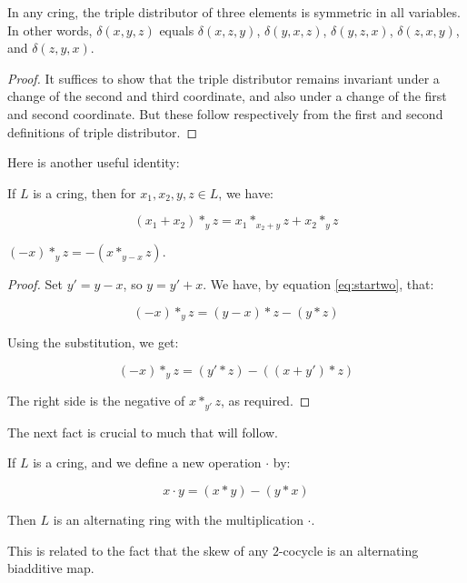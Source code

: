 \documentclass[10pt]{amsart}
\begin{document}
\begin{lemma}
  In any cring, the triple distributor of three elements is symmetric
  in all variables. In other words, $\delta(x,y,z)$ equals
  $\delta(x,z,y)$, $\delta(y,x,z)$, $\delta(y,z,x)$, $\delta(z,x,y)$,
  and $\delta(z,y,x)$.
\end{lemma}

\begin{proof}
  It suffices to show that the triple distributor remains invariant
  under a change of the second and third coordinate, and also under a
  change of the first and second coordinate. But these follow
  respectively from the first and second definitions of triple
  distributor.
\end{proof}

Here is another useful identity:

\begin{lemma}\label{lemma:shift}
  If $L$ is a cring, then for $x_1,x_2,y,z \in L$, we
  have:

  $$(x_1 + x_2) *_y z = x_1 *_{x_2 + y} z + x_2 *_y z$$
\end{lemma}

\begin{lemma}\label{lemma:sheartwisted}
  $(-x) *_y z = -(x *_{y - x} z)$. 
\end{lemma}

\begin{proof}
  Set $y' = y - x$, so $y = y' + x$. We have, by equation
  \ref{eq:startwo}, that:

  $$(-x) *_y z = (y - x) * z - (y * z)$$

  Using the substitution, we get:

  $$(-x) *_y z = (y' * z) - ((x + y') * z)$$

  The right side is the negative of $x *_{y'} z$, as required.
\end{proof}

The next fact is crucial to much that will follow.

\begin{theorem}\label{thm:skewofcringisring}
  If $L$ is a cring, and we define a new operation $\cdot$ by:

  $$x \cdot y = (x * y) - (y * x)$$

  Then $L$ is an alternating ring with the multiplication $\cdot$.
\end{theorem}

This is related to the fact that the skew of any $2$-cocycle is an
alternating biadditive map.
\end{document}
